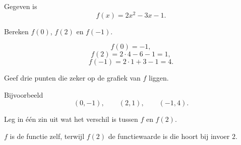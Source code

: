 \documentclass{ximera}
\begin{document}

\begin{oefening}[Functienotatie]{\oefB\ESS}

Gegeven is
\[
f(x)=2x^2-3x-1.
\]

\begin{question}
Bereken \(f(0)\), \(f(2)\) en \(f(-1)\).

\begin{oplossing}
\[
f(0)=-1,
\]
\[
f(2)=2\cdot4-6-1=1,
\]
\[
f(-1)=2\cdot1+3-1=4.
\]
\end{oplossing}
\end{question}

\begin{question}
Geef drie punten die zeker op de grafiek van \(f\) liggen.

\begin{oplossing}
Bijvoorbeeld
\[
(0,-1),\qquad (2,1),\qquad (-1,4).
\]
\end{oplossing}
\end{question}

\begin{question}
Leg in één zin uit wat het verschil is tussen \(f\) en \(f(2)\).

\begin{oplossing}
\(f\) is de functie zelf, terwijl \(f(2)\) de functiewaarde is die hoort bij invoer \(2\).
\end{oplossing}
\end{question}

\end{oefening}

\end{document}

